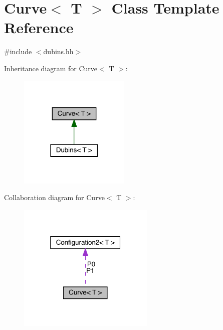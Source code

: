 \hypertarget{class_curve}{}\section{Curve$<$ T $>$ Class Template Reference}
\label{class_curve}


{\ttfamily \#include $<$dubins.\+hh$>$}



Inheritance diagram for Curve$<$ T $>$\+:
\nopagebreak
\begin{figure}[H]
\begin{center}
\leavevmode
\includegraphics[width=150pt]{class_curve__inherit__graph}
\end{center}
\end{figure}


Collaboration diagram for Curve$<$ T $>$\+:
\nopagebreak
\begin{figure}[H]
\begin{center}
\leavevmode
\includegraphics[width=184pt]{class_curve__coll__graph}
\end{center}
\end{figure}
